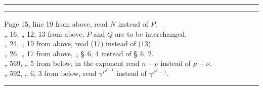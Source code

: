 \begin{center}
\rule{6em}{0.4pt}
\end{center}

\begin{center}
\textbf{}
\end{center}

\begin{center}
\rule{6em}{0.4pt}
\end{center}

\begin{flushleft}
Page 15, line 19 from above, read $N$ instead of $P$. \\
„ 16, „ 12, 13 from above, $P$ and $Q$ are to be interchanged. \\
„ 21, „ 19 from above, read (17) instead of (13). \\
„ 26, „ 17 from above, „ \S.\,6, 4 instead of \S.\,6, 2. \\
„ 569, „ 5 from below, in the exponent read $n-\nu$ instead of $\mu-\nu$. \\
„ 592, „ 6, 3 from below, read $\gamma^{P^{f-1}}$ instead of $\gamma^{P^f-1}$.
\end{flushleft}

\begin{center}
\rule{6em}{0.4pt}
\end{center}
